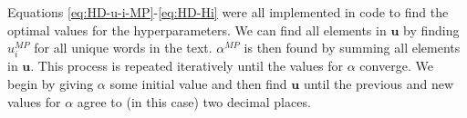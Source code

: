 Equations \ref{eq:HD-u-i-MP}-\ref{eq:HD-Hi} were all implemented in code to find the optimal values for the hyperparameters. We can find all elements in $\boldsymbol{u}$ by finding $u_{i}^{MP}$ for all unique words in the text. $\alpha^{MP}$ is then found by summing all elements in $\boldsymbol{u}$. This process is repeated iteratively until the values for $\alpha$ converge. We begin by giving $\alpha$ some initial value and then find $\boldsymbol{u}$ until the previous and new values for $\alpha$ agree to (in this case) two decimal places.


%
